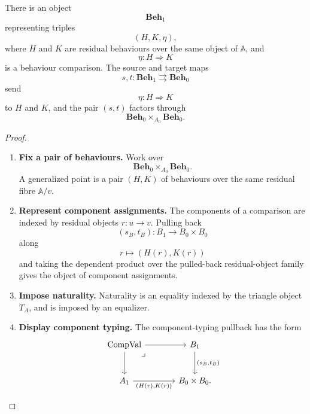 \begin{theorem}
\label{thm:object-of-behaviour-comparisons}
    There is an object
    \[
        \mathbf{Beh}_1
    \]
    representing triples
    \[
        (H,K,\eta),
    \]
    where \(H\) and \(K\) are residual behaviours over the same object of \(\mathbb A\), and
    \[
        \eta:H\Rightarrow K
    \]
    is a behaviour comparison. The source and target maps
    \[
        s,t:\mathbf{Beh}_1\rightrightarrows\mathbf{Beh}_0
    \]
    send
    \[
        \eta:H\Rightarrow K
    \]
    to \(H\) and \(K\), and the pair \((s,t)\) factors through
    \[
        \mathbf{Beh}_0\times_{A_0}\mathbf{Beh}_0.
    \]
\end{theorem}
\begin{proof}
    \leavevmode
    \begin{enumerate}
        \item \textbf{Fix a pair of behaviours.} Work over
        \[
            \mathbf{Beh}_0\times_{A_0}\mathbf{Beh}_0.
        \]
        A generalized point is a pair \((H,K)\) of behaviours over the same residual fibre \(\mathbb A/v\).

        \item \textbf{Represent component assignments.} The components of a comparison are indexed by residual objects \(r:u\to v\). Pulling back
        \[
            (s_B,t_B):B_1\to B_0\times B_0
        \]
        along
        \[
            r\longmapsto (H(r),K(r))
        \]
        and taking the dependent product over the pulled-back residual-object family gives the object of component assignments.

        \item \textbf{Impose naturality.} Naturality is an equality indexed by the triangle object \(T_A\), and is imposed by an equalizer.

        \item \textbf{Display component typing.} The component-typing pullback has the form
        \[
            \begin{tikzcd}[column sep=large, row sep=large]
                    \mathrm{CompVal}
                        \arrow[r]
                        \arrow[d]
                        \arrow[dr, phantom, "\lrcorner", very near start]
                &
                    B_1
                        \arrow[d, "{(s_B,t_B)}"]
                \\
                    A_1
                        \arrow[r, "{(H(r),K(r))}"']
                &
                    B_0\times B_0.
            \end{tikzcd}
        \]
    \end{enumerate}
\end{proof}

